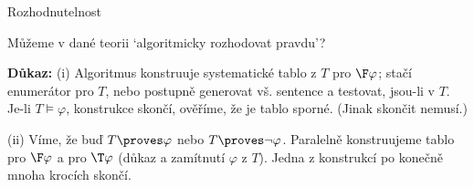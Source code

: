 \documentclass{beamer}
\begin{document}
\begin{frame}{Rozhodnutelnost}

    \pause
    \vspace{-3pt}
    Můžeme v dané teorii \alert{`algoritmicky rozhodovat pravdu'}?

    \pause
    \vspace{-3pt}

    
    \pause
    
    \pause
    \textbf{Důkaz:} \pause \alert{(i)} \pause Algoritmus konstruuje systematické tablo z $T$ pro $\F\varphi$; stačí enumerátor pro $T$, nebo postupně generovat vš. sentence a testovat, jsou-li v $T$. Je-li $T\models\varphi$, konstrukce skončí, ověříme, že je tablo sporné. (Jinak skončit nemusí.)
    
    \vspace{-3pt}  
    \pause \alert{(ii)} \pause
    Víme, že buď $T\proves\varphi$ nebo $T\proves\neg\varphi$. Paralelně konstruujeme tablo pro $\F\varphi$ a pro $\T\varphi$ (důkaz a zamítnutí $\varphi$ z $T$). Jedna z konstrukcí po konečně mnoha krocích skončí.
    \hfill\qedsymbol

\end{frame}
\end{document}
